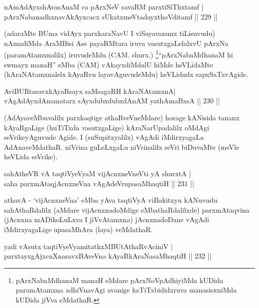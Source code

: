 \begin{shl}
nAmAdAyxshAvasAnaM ca pArx\footnotemark NeV savaRM parxtiSiThxtamf |\\
pArxNabanadhxnavAkAyxcacx sUkatxmeVtadayxthoVditamf \hfill || 229 ||
\end{shl}

\begin{artha}
(adaraMte BUma vidAyx parxkaraNavU I viSayavanunx tiLisuvudu) nAmadiMda AraMBisi Ase payaRMtara iruva vasutxgaLelalxvU pArxNa (paramAtamxnalilx) iruvudeMdu (CAM. shurx.) \footnote{pArxNabaMdhanaM manaH eMdare pArxNoVpAdhiyiMda kUDida paramAtamxna adhiVnavAgi avanige kaTiTxbididxruva manasisxniMda kUDida jiVva eMdathaR.}``pArxNabaMdhanaM hi swmayx manaH'' eMba (CAM) vAkayxdiMdalU hiMde heVLidaMte (kAraNAtamxnalelx kAyaRvu layavAguvudeMdu) heVLidudx sapxSaTxvAgide.
\end{artha}

\begin{shl}
AviBURtasavxkAyaRsayx saMsagaRH kAraNAtamxnA|\\
vAgAdAyxdAnamatarx sAyxdubxdubxdAnAM yathA\s maBxsA \hfill || 230 ||
\end{shl}

\begin{artha}
(AdAyaveMbuvalilx parxkaqtige athaRveVneMdare) horage kANisida tananx kAyaRgaLige (huTiTxda vasutxgaLige) kAraNarUpadalilx oMdAgi seVrikeyAguvude Agide. I (suSupitxyalilx) vAgAdi iMdirxyagaLa AdAnaveMdathaR. niVrina guLeLxgaLu niVrinalilx seVri biDuvaMte (meVle heVLida seVrike).
\end{artha}

\begin{shl}
sahAtheVR vA taqtiVyeVyaM vijAcnxneVneVti yA shurxtA |\\
saha parxmAtaqjAcnxneVna vAgAdeVrupasaMhaqtiH \hfill || 231 ||
\end{shl}

\begin{artha}
athavA - `vijAcnxneVna' eMba yAva taqtiVyA viBakitxyu kANuvudu  sahAthaRdalilx (aMdare vijAcnxnadoMdige eMbathaRdalilxde) parxmAtaqvina (jAcnxna mADikoLuLxva I jiVvAtamxna) jAcnxnadoDane vAgAdi iMdirxyagaLige upasaMhAra (laya) veMdathaR.
\end{artha}

\begin{shl}
yadi vA\s sutx taqtiVyeVyamitathxMBUtAthaRvAciniV |\\
parxtayxgAjxcnXnasavxBAveVna kAyaRkAraNasaMhaqtiH \hfill || 232 ||
\end{shl}

